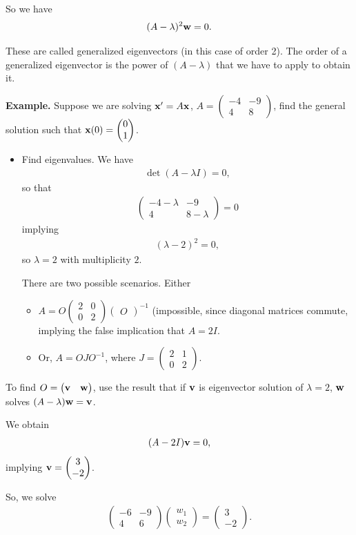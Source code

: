 \documentclass{article}
\newcommand{\mat}[1]{\begin{pmatrix}#1\end{pmatrix}}
\begin{document}
So we have
\begin{align*}
  (A - \lambda)^2 \mathbf{w} = 0.
\end{align*}

These are called generalized eigenvectors (in this case of order 2).  The order of a generalized eigenvector is the power of $(A - \lambda)$ that we have to apply to obtain it.

{\bf Example.} Suppose we are solving $\mathbf{x}' = A \mathbf{x}$, $A = \mat{-4 & -9 \\ 4 & 8}$, find the general solution such that $\mbf{x}(0) = \mat{0 \\ 1}$.

\begin{itemize}
  \item Find eigenvalues.  We have
    \begin{align*}
      \det(A - \lambda I) = 0,
    \end{align*}
    so that
    \begin{align*}
      \mat{-4 -\lambda & -9 \\ 4 & 8 - \lambda} = 0
    \end{align*}
    implying
    \begin{align*}
      (\lambda - 2)^2 = 0,
    \end{align*}
    so $\lambda = 2$ with multiplicity $2$.

    There are two possible scenarios.  Either
    \begin{itemize}
      \item $A = O \mat{2 & 0 \\ 0 & 2} \mat{O}^{-1}$ (impossible, since diagonal matrices commute, implying the false implication that $A = 2I$.
        \item Or, $A = O J O^{-1}$, where $J = \mat{2 & 1 \\ 0 & 2}$.
    \end{itemize}
\end{itemize}

To find $O = \mat{\mbf{v} & \mbf{w}}$, use the result that if $\mathbf{v}$ is eigenvector solution of $\lambda = 2$, $\mathbf{w}$ solves $(A - \lambda) \mathbf{w} = \mathbf{v}$.

We obtain
\begin{align*}
  (A - 2 I) \mathbf{v} = 0,
\end{align*}
implying $\mbf{v} = \mat{3 \\ - 2}$.

So, we solve
\begin{align*}
  \mat{-6 & -9 \\ 4 & 6} \mat{w_1 \\ w_2} = \mat{3 \\ -2}.
\end{align*}
\end{document}
